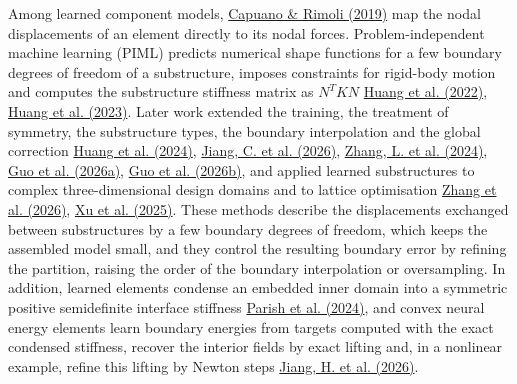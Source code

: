 \documentclass[preprint,12pt,authoryear]{elsarticle}
\begin{document}
Among learned component models, \href{https://doi.org/10.1016/j.cma.2018.10.046}{Capuano \& Rimoli (2019)} map the nodal displacements of an element directly to its nodal forces. Problem-independent machine learning (PIML) predicts numerical shape functions for a few boundary degrees of freedom of a substructure, imposes constraints for rigid-body motion and computes the substructure stiffness matrix as \(N^TKN\) \href{https://doi.org/10.1016/j.eml.2022.101887}{Huang et al. (2022)}, \href{https://doi.org/10.1016/j.eml.2023.102041}{Huang et al. (2023)}. Later work extended the training, the treatment of symmetry, the substructure types, the boundary interpolation and the global correction \href{https://doi.org/10.1016/j.jmps.2024.105893}{Huang et al. (2024)}, \href{https://doi.org/10.1016/j.compstruct.2026.120865}{Jiang, C. et al. (2026)}, \href{https://doi.org/10.1016/j.eml.2024.102237}{Zhang, L. et al. (2024)}, \href{https://doi.org/10.1016/j.cma.2026.118955}{Guo et al. (2026a)}, \href{https://arxiv.org/abs/2607.22019v1}{Guo et al. (2026b)}, and applied learned substructures to complex three-dimensional design domains and to lattice optimisation \href{https://doi.org/10.1016/j.ijmecsci.2026.112007}{Zhang et al. (2026)}, \href{https://doi.org/10.1016/j.compstruct.2025.119330}{Xu et al. (2025)}. These methods describe the displacements exchanged between substructures by a few boundary degrees of freedom, which keeps the assembled model small, and they control the resulting boundary error by refining the partition, raising the order of the boundary interpolation or oversampling. In addition, learned elements condense an embedded inner domain into a symmetric positive semidefinite interface stiffness \href{https://doi.org/10.1007/s00466-024-02481-5}{Parish et al. (2024)}, and convex neural energy elements learn boundary energies from targets computed with the exact condensed stiffness, recover the interior fields by exact lifting and, in a nonlinear example, refine this lifting by Newton steps \href{https://arxiv.org/abs/2608.02036v1}{Jiang, H. et al. (2026)}.
\end{document}
